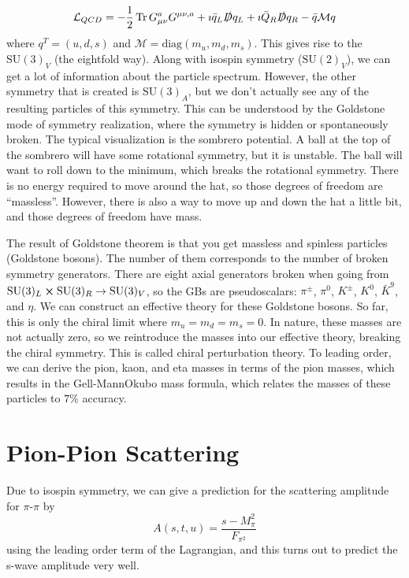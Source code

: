 \documentclass[a4paper,twoside,master.tex]{subfiles}
\begin{document}
\begin{equation}
    \mathcal{L}_{QCD} = - \frac{1}{2} \Tr G^a_{\mu \nu} G^{\mu \nu, a} + \imath \bar{q}_L \slashed{D} q_L + \imath \bar{Q}_R \slashed{D} q_R - \bar{q} \mathcal{M} q
\end{equation}
where $ q^T = (u, d, s) $ and $ \mathcal{M} = \text{diag}(m_u, m_d, m_s) $. This gives rise to the $ \text{SU} (3)_V $ (the eightfold way). Along with isospin symmetry ($ \text{SU}(2)_V $), we can get a lot of information about the particle spectrum. However, the other symmetry that is created is $ \text{SU}(3)_A $, but we don't actually see any of the resulting particles of this symmetry. This can be understood by the Goldstone mode of symmetry realization, where the symmetry is hidden or spontaneously broken. The typical visualization is the sombrero potential. A ball at the top of the sombrero will have some rotational symmetry, but it is unstable. The ball will want to roll down to the minimum, which breaks the rotational symmetry. There is no energy required to move around the hat, so those degrees of freedom are ``massless''. However, there is also a way to move up and down the hat a little bit, and those degrees of freedom have mass.


The result of Goldstone theorem is that you get massless and spinless particles (Goldstone bosons). The number of them corresponds to the number of broken symmetry generators. There are eight axial generators broken when going from $ \text{SU}(3)_L \cross \text{SU}(3)_R \to \text{SU}(3)_V $, so the GBs are pseudoscalars: $ \pi^{\pm} $, $ \pi^0 $, $ K^{\pm} $, $ K^0 $, $ \bar{K}^9 $, and $ \eta $. We can construct an effective theory for these Goldstone bosons. So far, this is only the chiral limit where $ m_u = m_d = m_s = 0 $. In nature, these masses are not actually zero, so we reintroduce the masses into our effective theory, breaking the chiral symmetry. This is called chiral perturbation theory. To leading order, we can derive the pion, kaon, and eta masses in terms of the pion masses, which results in the Gell-Mann\textemdash Okubo mass formula, which relates the masses of these particles to $ 7\% $ accuracy.

\section{Pion-Pion Scattering}
\label{sec:pion-pion_scattering}

Due to isospin symmetry, we can give a prediction for the scattering amplitude for $ \pi $-$ \pi $ by
\begin{equation}
    A(s,t,u) = \frac{s - M_{\pi}^2}{F_{\pi^2}}
\end{equation}
using the leading order term of the Lagrangian, and this turns out to predict the s-wave amplitude very well.
\end{document}
